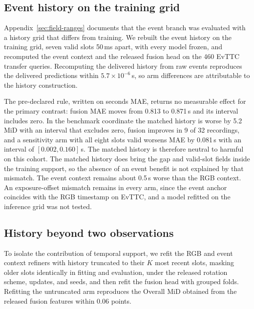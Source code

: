 \subsection{Event history on the training grid}
\label{sec:post-audit-event-history}
Appendix~\ref{sec:field-ranges} documents that the event branch was evaluated with a history grid that differs from training. We rebuilt the event history on the training grid, seven valid slots 50\,ms apart, with every model frozen, and recomputed the event context and the released fusion head on the 460 EvTTC transfer queries. Recomputing the delivered history from raw events reproduces the delivered predictions within $5.7\times10^{-6}$\,s, so arm differences are attributable to the history construction.

\begin{table}[htbp]
\centering\small
\caption{Matched versus delivered event history on 460 development-exposed EvTTC queries; 10,000 complete-recording resamples across 32 recordings. Positive values mean the first arm is worse. MiD is the benchmark's motion-in-depth error, $10^4|\Delta\phi|$, averaged over queries without band weights.}
\label{tab:post-audit-event-history}
\end{table}

The pre-declared rule, written on seconds MAE, returns no measurable effect for the primary contrast: fusion MAE moves from 0.813 to 0.871\,s and its interval includes zero. In the benchmark coordinate the matched history is worse by 5.2 MiD with an interval that excludes zero, fusion improves in 9 of 32 recordings, and a sensitivity arm with all eight slots valid worsens MAE by 0.081\,s with an interval of $[0.002,0.160]$\,s. The matched history is therefore neutral to harmful on this cohort. The matched history does bring the gap and valid-slot fields inside the training support, so the absence of an event benefit is not explained by that mismatch. The event context remains about 0.5\,s worse than the RGB context. An exposure-offset mismatch remains in every arm, since the event anchor coincides with the RGB timestamp on EvTTC, and a model refitted on the inference grid was not tested.

\subsection{History beyond two observations}
\label{sec:post-audit-history}
To isolate the contribution of temporal support, we refit the RGB and event context refiners with history truncated to their $K$ most recent slots, masking older slots identically in fitting and evaluation, under the released rotation scheme, updates, and seeds, and then refit the fusion head with grouped folds. Refitting the untruncated arm reproduces the Overall MiD obtained from the released fusion features within 0.06 points.

